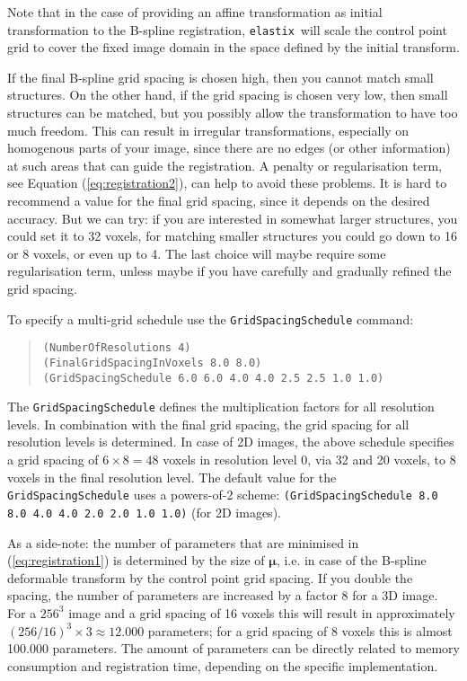 \documentclass[]{report}
\newcommand{\elastix}{\texttt{elastix}}
\newcommand{\vmu}{\bm{\mu}}
\begin{document}
Note that in the case of providing an affine transformation as
initial transformation to the B-spline registration, \elastix\ will
scale the control point grid to cover the fixed image domain in the
space defined by the initial transform.

If the final B-spline grid spacing is chosen high, then you cannot
match small structures. On the other hand, if the grid spacing is
chosen very low, then small structures can be matched, but you
possibly allow the transformation to have too much freedom. This can
result in irregular transformations, especially on homogenous parts
of your image, since there are no edges (or other information) at
such areas that can guide the registration. A penalty or
regularisation term, see Equation (\ref{eq:registration2}), can help
to avoid these problems. It is hard to recommend a value for the
final grid spacing, since it depends on the desired accuracy. But we
can try: if you are interested in somewhat larger structures, you
could set it to 32 voxels, for matching smaller structures you could
go down to 16 or 8 voxels, or even up to 4. The last choice will
maybe require some regularisation term, unless maybe if you have
carefully and gradually refined the grid spacing.

To specify a multi-grid schedule use the \texttt{GridSpacingSchedule}
command:
\begin{quote}
\texttt{(NumberOfResolutions 4)} \\
\texttt{(FinalGridSpacingInVoxels 8.0 8.0)} \\
\texttt{(GridSpacingSchedule 6.0 6.0 4.0 4.0 2.5 2.5 1.0 1.0)}
\end{quote}
The \texttt{GridSpacingSchedule} defines the multiplication
factors for all resolution levels. In combination with the final
grid spacing, the grid spacing for all resolution levels is
determined. In case of 2D images, the above schedule specifies a
grid spacing of $6 \times 8 = 48$ voxels in resolution level 0,
via 32 and 20 voxels, to 8 voxels in the final resolution level.
The default value for the \texttt{GridSpacingSchedule} uses a
powers-of-2 scheme: \texttt{(GridSpacingSchedule 8.0 8.0 4.0 4.0
2.0 2.0 1.0 1.0)} (for 2D images).

As a side-note: the number of parameters that are minimised in
(\ref{eq:registration1}) is determined by the size of $\vmu$, i.e.
in case of the B-spline deformable transform by the control point
grid spacing. If you double the spacing, the number of parameters
are increased by a factor 8 for a 3D image. For a $256^3$ image and
a grid spacing of 16 voxels this will result in approximately
$(256/16)^3 \times 3 \approx 12.000$ parameters; for a grid spacing
of 8 voxels this is almost 100.000 parameters. The amount of
parameters can be directly related to memory consumption and
registration time, depending on the specific implementation.
\end{document}
